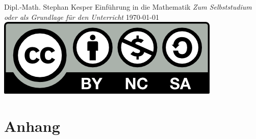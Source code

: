 \documentclass[]{memoir}
\begin{document}
\frontmatter

\thispagestyle{empty}
\begin{flushright}
{\Large Dipl.-Math. Stephan Kesper}
\vskip 3cm
{\Huge Einführung in die Mathematik}
\vskip 1cm
{\Large \textsl{Zum Selbststudium oder als Grundlage für den Unterricht}}
\vskip 5cm
\today
\vfill
\includegraphics{../../../License/by-nc-sa.png}
\end{flushright}
\newpage




\tableofcontents

\newpage

\listoffigures


\mainmatter


















%
%









\appendix
\part{Anhang}





\backmatter



\printindex
\end{document}
